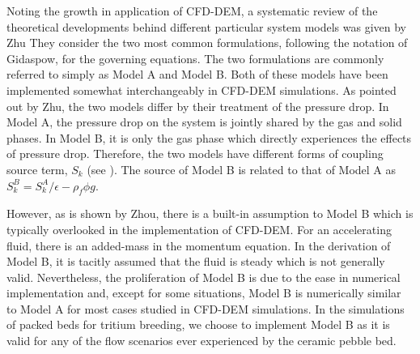 Noting the growth in application of CFD-DEM, a systematic review of the theoretical developments behind different particular system models was given by Zhu\etal\cite{Zhu2007} They consider the two most common formulations, following the notation of Gidaspow, for the governing equations. The two formulations are commonly referred to simply as Model A and Model B.\cite{gidaspow1994multiphase} Both of these models have been implemented somewhat interchangeably in CFD-DEM simulations. As pointed out by Zhu\etal, the two models differ by their treatment of the pressure drop. In Model A, the pressure drop on the system is jointly shared by the gas and solid phases. In Model B, it is only the gas phase which directly experiences the effects of pressure drop. Therefore, the two models have different forms of coupling source term, $S_k$ (see ). The source of Model B is related to that of Model A as $S_k^B = S_k^A/\epsilon - \rho_f\phi g$.

However, as is shown by Zhou\etal, there is a built-in assumption to Model B which is typically overlooked in the implementation of CFD-DEM. For an accelerating fluid, there is an added-mass in the momentum equation. In the derivation of Model B, it is tacitly assumed that the fluid is steady which is not generally valid.\cite{Zhou2010} Nevertheless, the proliferation of Model B is due to the ease in numerical implementation and, except for some situations, Model B is numerically similar to Model A for most cases studied in CFD-DEM simulations.\cite{Zhou2010} In the simulations of packed beds for tritium breeding, we choose to implement Model B as it is valid for any of the flow scenarios ever experienced by the ceramic pebble bed.

 
 

%
%
